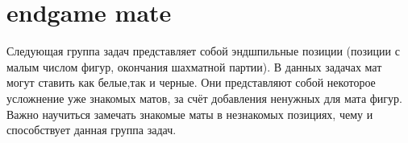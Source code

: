 \section*{endgame mate}


Следующая группа задач представляет собой эндшпильные позиции (позиции с малым числом фигур, окончания шахматной партии). В данных задачах мат могут ставить как белые,так и черные. Они представляют собой некоторое усложнение уже знакомых матов, за счёт добавления ненужных для мата фигур. Важно научиться замечать знакомые маты в незнакомых позициях, чему и способствует данная группа задач.
